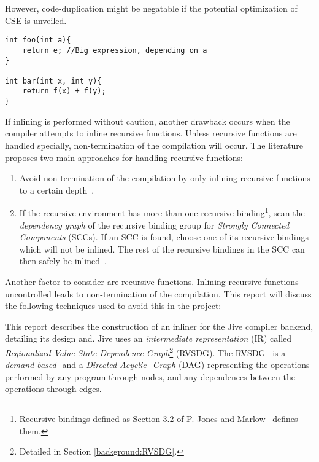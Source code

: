 However, code-duplication might be negatable if the potential optimization of
CSE is unveiled.

\begin{lstlisting}[label={lst:code-dup}, style=global_customcpp,
caption={Code duplication in \lstinline!bar()!, when inlining \lstinline!foo()!
into \lstinline!bar()!.}]
int foo(int a){
	return e; //Big expression, depending on a
}

int bar(int x, int y){
	return f(x) + f(y);
}
\end{lstlisting}
\vspace{-3\parskip} %

If inlining is performed without caution, another drawback occurs when the
compiler attempts to inline recursive functions. Unless recursive functions are
handled specially, non-termination of the compilation will occur. The literature
proposes two main approaches for handling recursive functions:

\begin{enumerate}

	\item Avoid non-termination of the compilation by only inlining recursive
functions to a certain depth~\cite{GHCPaper}\cite{InlineWhenHowSerrano}.

	\item If the recursive environment has more than one recursive
binding\footnote{Recursive bindings defined as Section 3.2 of P. Jones and
Marlow~\cite{GHCPaper} defines them.}, scan the \textit{dependency graph} of the
recursive binding group for \textit{Strongly Connected Components} (SCCs). If an
SCC is found, choose one of its recursive bindings which will not be inlined.
The rest of the recursive bindings in the SCC can then safely be
inlined~\cite{BasMscThesis}\cite{GHCPaper}.

\end{enumerate}

Another factor to consider are recursive functions. Inlining recursive functions
uncontrolled leads to non-termination of the compilation. This report will
discuss the following techniques used to avoid this in the project:

This report describes the construction of an inliner for the Jive compiler
backend, detailing its design and. Jive uses an \textit{intermediate
representation} (IR) called \textit{Regionalized Value-State Dependence
Graph}\footnote{Detailed in Section \ref{background:RVSDG}.} (RVSDG). The
RVSDG~\cite{RVSDG:HiPEACpaper} is a \textit{demand based-} and a \textit{Directed
Acyclic \mbox{-Graph}} (DAG) representing the operations performed by any program
through nodes, and any dependences between the operations through edges.

